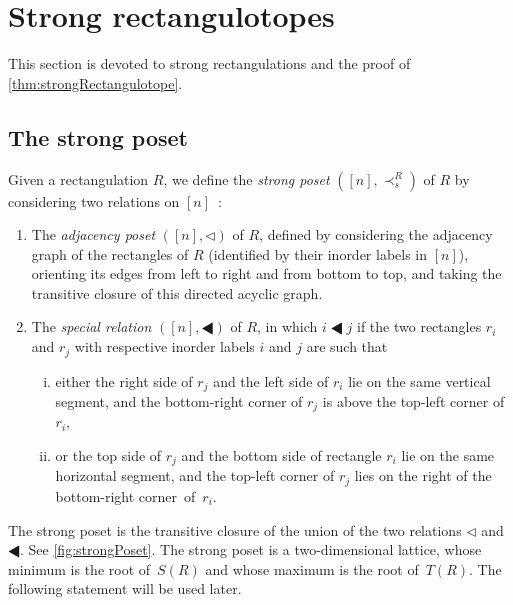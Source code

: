\documentclass{amsart}
\theoremstyle{definition}
\newcommand{\darkblue}{\color{darkblue}} %
\newcommand{\defn}[1]{\textsl{\darkblue #1}} %
\newcommand{\tri}{\lhd}
\newcommand{\btri}{\LHD}
\begin{document}

\section{Strong rectangulotopes}
\label{sec:strongRectangulotopes}

This section is devoted to strong rectangulations and the proof of \cref{thm:strongRectangulotope}.


\subsection{The strong poset}
\label{subsec:strongPoset}

Given a rectangulation $R$, we define the \defn{strong poset} $([n],\prec_s^R)$ of $R$ by considering two relations on $[n]$~\cite{ACFF24}:
\begin{enumerate}
\item The \defn{adjacency poset} $([n],\tri)$ of $R$, defined by considering the adjacency graph of the rectangles of $R$ (identified by their inorder labels in $[n]$), orienting its edges from left to right and from bottom to top, and taking the transitive closure of this directed acyclic graph.
\item The \defn{special relation} $([n],\btri)$ of $R$, in which $i\btri j$ if the two rectangles $r_i$ and $r_j$ with respective inorder labels $i$ and $j$ are such that 
	\begin{enumerate}[(i)]
	\item either the right side of $r_j$ and the left side of $r_i$ lie on the same vertical segment, and the bottom-right corner of $r_j$ is above the top-left corner of $r_i$, 
	\item or the top side of $r_j$ and the bottom side of rectangle $r_i$ lie on the same horizontal segment, and the top-left corner of $r_j$ lies on the right of the bottom-right corner~of~$r_i$.
	\end{enumerate}
\end{enumerate}
The strong poset is the transitive closure of the union of the two relations $\tri$ and $\btri$.
See \cref{fig:strongPoset}.
The strong poset is a two-dimensional lattice, whose minimum is the root of~$S(R)$ and whose maximum is the root of~$T(R)$. The following statement will be used later.
\end{document}
